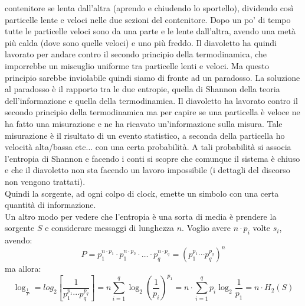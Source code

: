 \documentclass[a4paper,12pt, oneside]{book}
\begin{document}
contenitore se lenta dall'altra (aprendo e chiudendo lo sportello), dividendo
così particelle lente e veloci nelle due sezioni del contenitore. Dopo un po' di
tempo tutte le particelle veloci sono da una parte e le lente dall'altra, avendo
una metà più calda (dove sono quelle veloci) e uno più freddo. Il diavoletto ha
quindi lavorato per andare contro il secondo principio della termodinamica, che
imporrebbe un miscuglio uniforme tra particelle lenti e veloci. Ma questo
principio sarebbe inviolabile quindi siamo di fronte ad un paradosso. La
soluzione al paradosso è il rapporto tra le due entropie, quella di Shannon
della teoria dell'informazione e quella della termodinamica. Il diavoletto
ha lavorato contro il secondo principio della termodinamica ma per capire se una
particella è veloce ne ha fatto una misurazione e ne ha ricavato un'informazione
sulla misura. Tale misurazione è il risultato di un evento statistico, a seconda
della particella ho velocità alta/bassa etc$\ldots$ con una certa probabilità. A
tali probabilità si associa l'entropia di Shannon e facendo i conti si scopre
che comunque il sistema è chiuso e che il diavoletto non sta facendo un lavoro
impossibile (i dettagli del discorso non vengono trattati).\\
Quindi la sorgente, ad ogni colpo di clock, emette un simbolo con una certa
quantità di informazione. \\
Un altro modo per vedere che l'entropia è una sorta di media è prendere la
sorgente $S$ e considerare messaggi di lunghezza $n$. Voglio avere $n\cdot p_i$
volte $s_i$, avendo: 
\[P=p_1^{n\cdot p_1}\cdot p_1^{n\cdot p_2}\cdot \ldots \cdot p_q^{n\cdot
    p_q}=(p_1^{p_1}\cdots p_q^{p_q})^n\]
ma allora:
\[\log_\frac{1}{P}=log_2\left[\frac{1}{p_1^{p_1}\cdots
      p_q^{p_q}}\right]=n\sum_{i=1}^q\log_2\left(\frac{1}{p_i}\right)^{p_1}=n\cdot
  \sum_{i=1}^qp_i\log_2\frac{1}{p_1}=n\cdot H_2(S)\]
\end{document}
